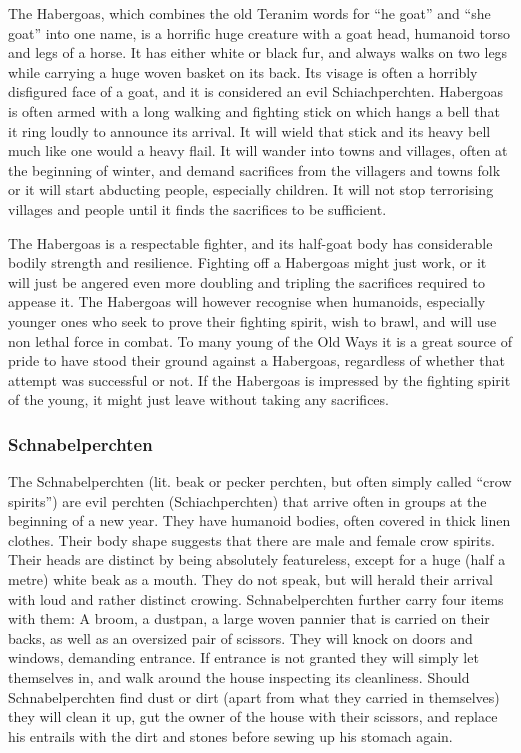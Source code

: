 The Habergoas, which combines the old Teranim words for ``he goat'' and ``she
goat'' into one name, is a horrific huge creature with a goat head, humanoid
torso and legs of a horse. It has either white or black fur, and always walks
on two legs while carrying a huge woven basket on its back. Its visage is
often a horribly disfigured face of a goat, and it is considered an evil
Schiachperchten. Habergoas is often armed with a long walking and fighting
stick on which hangs a bell that it ring loudly to announce its arrival. It
will wield that stick and its heavy bell much like one would a heavy flail. It
will wander into towns and villages, often at the beginning of winter, and
demand sacrifices from the villagers and towns folk or it will start abducting
people, especially children. It will not stop terrorising villages and people
until it finds the sacrifices to be sufficient.

The Habergoas is a respectable fighter, and its half-goat body has
considerable bodily strength and resilience. Fighting off a Habergoas might
just work, or it will just be angered even more doubling and tripling the
sacrifices required to appease it. The Habergoas will however recognise when
humanoids, especially younger ones who seek to prove their fighting spirit,
wish to brawl, and will use non lethal force in combat. To many young of the
Old Ways it is a great source of pride to have stood their ground against a
Habergoas, regardless of whether that attempt was successful or not. If the
Habergoas is impressed by the fighting spirit of the young, it might just
leave without taking any sacrifices.

\subsubsection{Schnabelperchten}
\label{sec:Schnabelperchten}

The Schnabelperchten (lit. beak or pecker perchten, but often simply called
``crow spirits'') are evil perchten (Schiachperchten) that arrive often in
groups at the beginning of a new year. They have humanoid bodies, often
covered in thick linen clothes. Their body shape suggests that there are male
and female crow spirits. Their heads are distinct by being absolutely
featureless, except for a huge (half a metre) white beak as a mouth. They do
not speak, but will herald their arrival with loud and rather distinct
crowing. Schnabelperchten further carry four items with them: A broom, a
dustpan, a large woven pannier that is carried on their backs, as well as an
oversized pair of scissors. They will knock on doors and windows, demanding
entrance. If entrance is not granted they will simply let themselves in, and
walk around the house inspecting its cleanliness. Should Schnabelperchten find
dust or dirt (apart from what they carried in themselves) they will clean it
up, gut the owner of the house with their scissors, and replace his entrails
with the dirt and stones before sewing up his stomach again.

